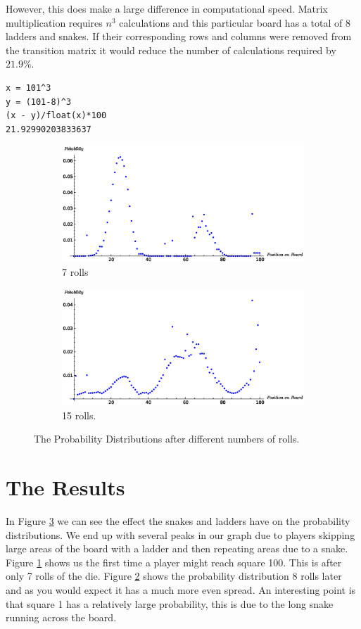 \documentclass[a4paper]{article}
\begin{document}
However, this does make a large difference in computational speed. Matrix multiplication requires $n^3$ calculations and this particular board has a total of 8 ladders and snakes. If their corresponding rows and columns were removed from the transition matrix it would reduce the number of calculations required by $21.9\%$.
\begin{verbatim}
x = 101^3
y = (101-8)^3
(x - y)/float(x)*100
21.92990203833637
\end{verbatim}

\begin{figure}[!htbp]
\centering
\begin{subfigure}{.5\textwidth}
  \centering
  \includegraphics[width=\linewidth]{images/7plot}
  \caption{7 rolls}
  \label{7rolls}
\end{subfigure}%
\begin{subfigure}{.5\textwidth}
  \centering
  \includegraphics[width=\linewidth]{images/15plot}
  \caption{15 rolls.}
  \label{15rolls}
\end{subfigure}
\caption{The Probability Distributions after different numbers of rolls.}
\label{plots}
\end{figure}

\section{The Results}
In Figure \ref{plots} we can see the effect the snakes and ladders have on the probability distributions. We end up with several peaks in our graph due to players skipping large areas of the board with a ladder and then repeating areas due to a snake. Figure \ref{7rolls} shows us the first time a player might reach square 100. This is after only 7 rolls of the die. Figure \ref{15rolls} shows the probability distribution 8 rolls later and as you would expect it has a much more even spread. An interesting point is that square 1 has a relatively large probability, this is due to the long snake running across the board.
\end{document}
